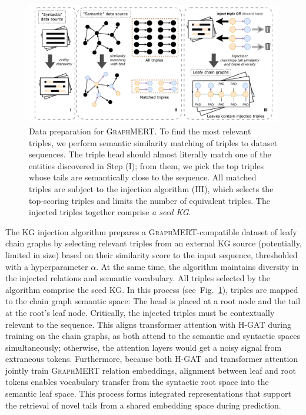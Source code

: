 \documentclass[10pt]{article}
\newcommand{\ours}{\textsc{GraphMERT}\xspace}
\begin{document}
\begin{figure}[t]
\centering
\includegraphics[width=\linewidth]{pictures/injection_process.pdf}
\caption{Data preparation for \ours. To find the most relevant triples, we perform semantic similarity matching of triples to dataset sequences. The triple head should almost literally match one of the entities discovered in Step (I); from them, we pick the top triples whose tails are semantically close to the sequence. All matched triples are subject to the injection algorithm (III), which selects the top-scoring triples and limits the number of equivalent triples. The injected triples together comprise \textit{a seed KG}.}
\label{fig:injection_process}
\end{figure}

The KG injection algorithm prepares a \ours-compatible dataset of leafy chain graphs by selecting relevant triples from an external KG source (potentially, limited in size) based on their similarity score to the input sequence, thresholded with a hyperparameter $\alpha$. At the same time, the algorithm maintains diversity in the injected relations and semantic vocabulary. All triples selected by the algorithm comprise the seed KG. In this process (see~Fig.~\ref{fig:injection_process}), triples are mapped to the chain graph semantic space: The head is placed at a root node and the tail at the root's leaf node. Critically, the injected triples must be contextually relevant to the sequence. This aligns transformer attention with H-GAT during training on the chain graphs, as both attend to the semantic and syntactic spaces simultaneously; otherwise, the attention layers would get a noisy signal from extraneous tokens. Furthermore, because both H-GAT and transformer attention jointly train \ours relation embeddings, alignment between leaf and root tokens enables vocabulary transfer from the syntactic root space into the semantic leaf space. This process forms integrated representations that support the retrieval of novel tails from a shared embedding space during prediction.
\end{document}

